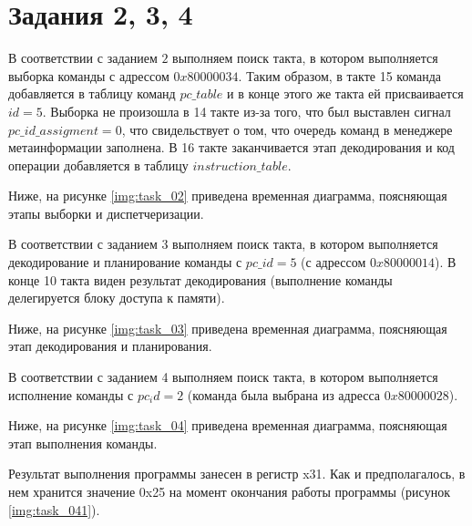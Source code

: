 \chapter{Задания 2, 3, 4}
\label{cha:impl}

В соответствии с заданием $2$ выполняем поиск такта, в котором выполняется выборка команды с адрессом $0x80000034$. Таким образом, в такте 15 команда добавляется в таблицу команд $pc\_table$ и в конце этого же такта ей присваивается $id = 5$. Выборка не произошла в 14 такте из-за того, что был выставлен сигнал $pc\_id\_assigment = 0$, что свидельствует о том, что очередь команд в менеджере метаинформации заполнена. В 16 такте заканчивается этап декодирования и код операции добавляется в таблицу $instruction\_table$.

Ниже, на рисунке \ref{img:task_02} приведена временная диаграмма, поясняющая этапы выборки и диспетчеризации.


В соответствии с заданием 3 выполняем поиск такта, в котором выполняется декодирование и планирование команды с $pc\_id = 5$ (с адрессом $0x80000014$). В конце 10 такта виден результат декодирования (выполнение команды делегируется блоку доступа к памяти).

Ниже, на рисунке \ref{img:task_03} приведена временная диаграмма, поясняющая этап декодирования и планирования.


В соответствии с заданием 4 выполняем поиск такта, в котором выполняется исполнение команды с $pc_id = 2$ (команда была выбрана из адресса $0x80000028$).

Ниже, на рисунке \ref{img:task_04} приведена временная диаграмма, поясняющая этап выполнения команды.


Результат выполнения программы занесен в регистр x31. Как и предполагалось, в нем хранится значение 0x25 на момент окончания работы программы (рисунок \ref{img:task_041}).

